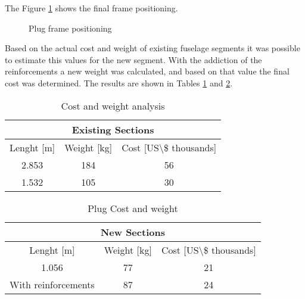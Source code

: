 The Figure \ref{fig:fig6_Plug_frame_positioning} shows the final frame positioning.

\begin{figure}[H] %
\caption{Plug frame positioning}
\label{fig:fig6_Plug_frame_positioning}
\end{figure}

Based on the actual cost and weight of existing fuselage segments it was possible to estimate this values for the new segment. With the addiction of the reinforcements a new weight was calculated, and based on that value the final cost was determined. The results are shown in Tables \ref{tab:tab5_cost_weight} and \ref{tab:tab5_plug_cost}.

\begin{table}[htbp]
  \centering
  \caption{Cost and weight analysis}
    \begin{tabular}{ccc}
    \toprule
    \multicolumn{3}{c}{\textbf{Existing Sections}} \\
    \midrule
    Lenght [m] & Weight [kg] & Cost [US\textbackslash{}\$ thousands] \\
    2.853 & 184   & 56 \\
    1.532 & 105   & 30 \\
    \bottomrule
    \end{tabular}%
  \label{tab:tab5_cost_weight}%
\end{table}%

\begin{table}[htbp]
  \centering
  \caption{Plug Cost and weight}
    \begin{tabular}{ccc}
    \toprule
    \multicolumn{3}{c}{\textbf{New Sections}} \\
    \midrule
    Lenght [m] & Weight [kg] & Cost [US\textbackslash{}\$ thousands] \\
    1.056 & 77    & 21 \\
    With reinforcements & 87    & 24 \\
    \bottomrule
    \end{tabular}%
  \label{tab:tab5_plug_cost}%
\end{table}%
